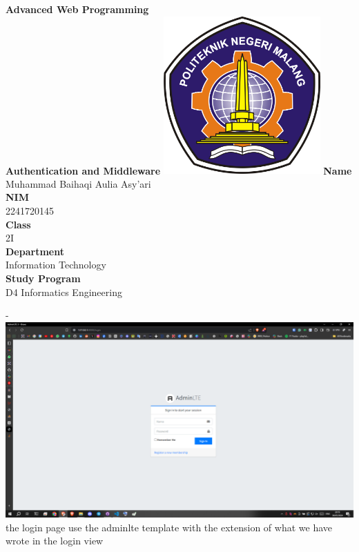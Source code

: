 \documentclass[12pt,titlepage]{article}
\newcommand{\vSubject}{Advanced Web Programming}
\newcommand{\vSubtitle}{Authentication and Middleware}
\newcommand{\vName}{Muhammad Baihaqi Aulia Asy'ari}
\newcommand{\vNIM}{2241720145}
\newcommand{\vClass}{2I}
\newcommand{\vDepartment}{Information Technology}
\newcommand{\vStudyProgram}{D4 Informatics Engineering}
\begin{document}
\begin{titlepage}
    \centering
    \vfill
    {\bfseries\LARGE
        \vSubject\\
        \vskip0.25cm
        \vSubtitle
    }
    \vfill
    \includegraphics[width=6cm]{images/polinema-logo.png}
    \vfill
    {
        \textbf{Name}\\
        \vName\\
        \vskip0.5cm
        \textbf{NIM}\\
        \vNIM\\
        \vskip0.5cm
        \textbf{Class}\\
        \vClass\\
        \vskip0.5cm
        \textbf{Department}\\
        \vDepartment\\
        \vskip0.5cm
        \textbf{Study Program}\\
        \vStudyProgram
    }
\end{titlepage}
\newpage
-
\\
\includegraphics[width=.99\textwidth]{images/figures/Screenshot (471).png} \\ the login page use the adminlte template with the extension of what we have wrote in the login view 
\end{document}
